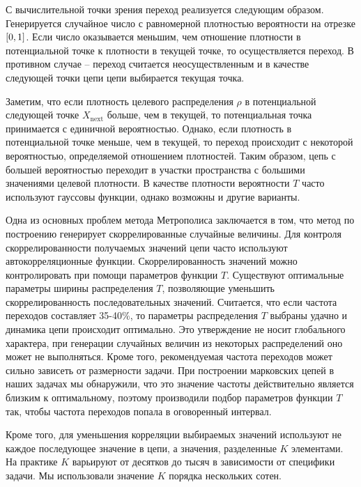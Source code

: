 С вычислительной точки зрения переход реализуется следующим образом. Генерируется случайное число с равномерной плотностью вероятности на отрезке $\left[ 0, 1 \right]$. Если число оказывается меньшим, чем отношение плотности в потенциальной точке к плотности в текущей точке, то осуществляется переход. В противном случае -- переход считается неосуществленным и в качестве следующей точки цепи цепи выбирается текущая точка. \par
Заметим, что если плотность целевого распределения $\rho$ в потенциальной следующей точке $X_\text{next}$ больше, чем в текущей, то потенциальная точка принимается с единичной вероятностью. Однако, если плотность в потенциальной точке меньше, чем в текущей, то переход происходит с некоторой вероятностью, определяемой отношением плотностей. Таким образом, цепь с большей вероятностью переходит в участки пространства с большими значениями целевой плотности. В качестве плотности вероятности $T$ часто используют гауссовы функции, однако возможны и другие варианты. \par
Одна из основных проблем метода Метрополиса заключается в том, что метод по построению генерирует скоррелированные случайные величины. Для контроля скоррелированности получаемых значений цепи часто используют автокорреляционные функции. Скоррелированность значений можно контролировать при помощи параметров функции $T$. Существуют оптимальные параметры ширины распределения $T$, позволяющие уменьшить скоррелированность последовательных значений. Считается, что если частота переходов составляет 35-40\%, то параметры распределения $T$ выбраны удачно и динамика цепи происходит оптимально. Это утверждение не носит глобального характера, при генерации случайных величин из некоторых распределений оно может не выполняться. Кроме того, рекомендуемая частота переходов может сильно зависеть от размерности задачи. При построении марковских цепей в наших задачах мы обнаружили, что это значение частоты действительно является близким к оптимальному, поэтому производили подбор параметров функции $T$ так, чтобы частота переходов попала в оговоренный интервал. \par
Кроме того, для уменьшения корреляции выбираемых значений используют не каждое последующее значение в цепи, а значения, разделенные $K$ элементами. На практике $K$ варьируют от десятков до тысяч в зависимости от специфики задачи. Мы использовали значение $K$ порядка нескольких сотен. \par
